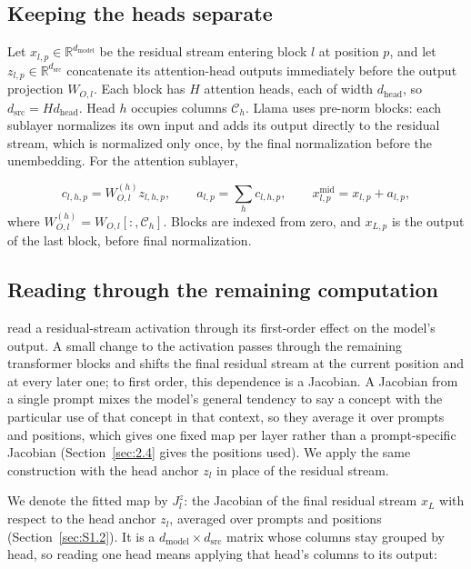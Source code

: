 \documentclass[11pt,a4paper]{article}
\begin{document}
\subsection{Keeping the heads separate}\label{sec:2.1}

Let $x_{l,p}\in\mathbb R^{d_{\mathrm{model}}}$ be the residual stream entering block $l$ at position $p$, and let $z_{l,p}\in\mathbb R^{d_{\mathrm{src}}}$ concatenate its attention-head outputs immediately before the output projection $W_{O,l}$. Each block has $H$ attention heads, each of width $d_{\mathrm{head}}$, so $d_{\mathrm{src}}=H d_{\mathrm{head}}$. Head $h$ occupies columns $\mathcal C_h$. Llama uses pre-norm blocks: each sublayer normalizes its own input and adds its output directly to the residual stream, which is normalized only once, by the final normalization before the unembedding. For the attention sublayer,

\[
c_{l,h,p}=W_{O,l}^{(h)}z_{l,h,p},\qquad
 a_{l,p}=\sum_h c_{l,h,p},\qquad
 x^{\mathrm{mid}}_{l,p}=x_{l,p}+a_{l,p},
\]
where $W_{O,l}^{(h)}=W_{O,l}[:,\mathcal C_h]$. Blocks are indexed from zero, and $x_{L,p}$ is the output of the last block, before final normalization.

\subsection{Reading through the remaining computation}\label{sec:2.2}

\citet{gurnee2026} read a residual-stream activation through its first-order effect on the model's output. A small change to the activation passes through the remaining transformer blocks and shifts the final residual stream at the current position and at every later one; to first order, this dependence is a Jacobian. A Jacobian from a single prompt mixes the model's general tendency to say a concept with the particular use of that concept in that context, so they average it over prompts and positions, which gives one fixed map per layer rather than a prompt-specific Jacobian (Section~\ref{sec:2.4} gives the positions used). We apply the same construction with the head anchor $z_l$ in place of the residual stream.

We denote the fitted map by $J_l^z$: the Jacobian of the final residual stream $x_L$ with respect to the head anchor $z_l$, averaged over prompts and positions (Section~\ref{sec:S1.2}). It is a $d_{\mathrm{model}}\times d_{\mathrm{src}}$ matrix whose columns stay grouped by head, so reading one head means applying that head's columns to its output:
\end{document}
